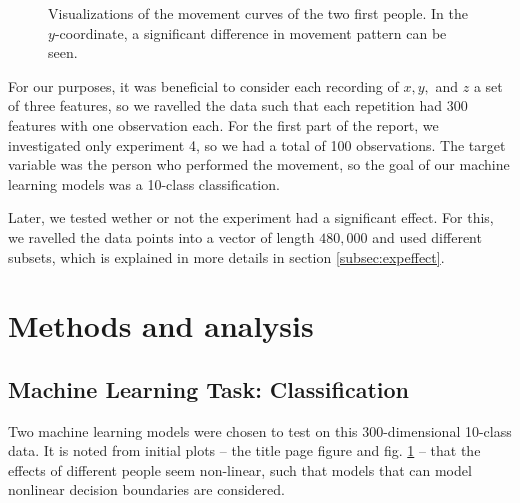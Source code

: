 \documentclass[11pt,fleqn]{article}
\begin{document}
\begin{figure}[H]
	
	\centering
	\caption{Visualizations of the movement curves of the two first people. In the \(y\)-coordinate, a significant difference in movement pattern can be seen.}
	\label{fig:2dtrajects}
\end{figure}\noindent 
For our purposes, it was beneficial to consider each recording of $ x, y, $ and $ z $ a set of three features, so we ravelled the data such that each repetition had $ 300 $ features with one observation each.
For the first part of the report, we investigated only experiment 4, so we had a total of 100 observations.
The target variable was the person who performed the movement, so the goal of our machine learning models was a 10-class classification.

Later, we tested wether or not the experiment had a significant effect.
For this, we ravelled the data points into a vector of length $ 480,000 $ and used different subsets, which is explained in more details in section \ref{subsec:expeffect}.



\section{Methods and analysis}


\subsection{Machine Learning Task: Classification}
Two machine learning models were chosen to test on this 300-dimensional 10-class data.
It is noted from initial plots -- the title page figure and fig. \ref{fig:2dtrajects} -- that the effects of different people seem non-linear, such that models that can model nonlinear decision boundaries are considered.
\end{document}
